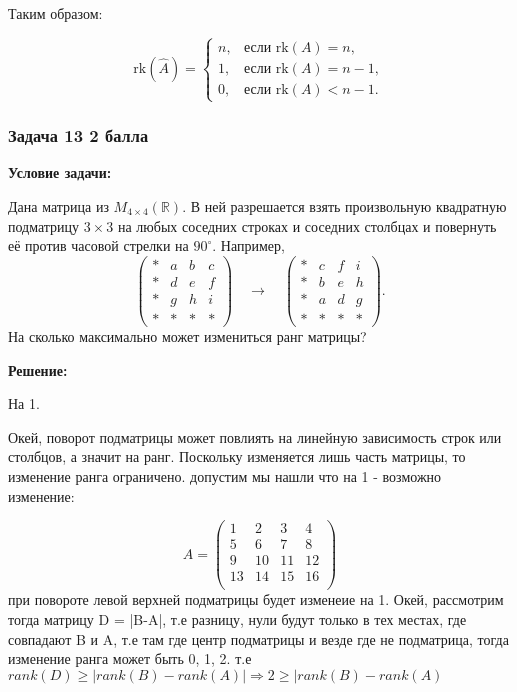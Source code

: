 \documentclass[a4paper,12pt]{article}
\begin{document}
Таким образом: 

\[
\text{rk}(\hat{A}) =
\begin{cases}
n, & \text{если } \text{rk}(A) = n, \\
1, & \text{если } \text{rk}(A) = n - 1, \\
0, & \text{если } \text{rk}(A) < n - 1.
\end{cases}
\]

\subsubsection{Задача 13 \hfill 2 балла}
\textbf{Условие задачи:}

Дана матрица из \( M_{4 \times 4}(\mathbb{R}) \). В ней разрешается взять произвольную квадратную подматрицу \( 3 \times 3 \) на любых соседних строках и соседних столбцах и повернуть её против часовой стрелки на \( 90^\circ \). Например,
\[
\begin{pmatrix}
* & a & b & c \\
* & d & e & f \\
* & g & h & i \\
* & * & * & *
\end{pmatrix}
\quad \rightarrow \quad
\begin{pmatrix}
* & c & f & i \\
* & b & e & h \\
* & a & d & g \\
* & * & * & *
\end{pmatrix}.
\]
На сколько максимально может измениться ранг матрицы?

\textbf{Решение:}

На 1. 

Окей, поворот подматрицы может повлиять на линейную зависимость строк или столбцов, а значит на ранг. Поскольку изменяется лишь часть матрицы, то изменение ранга ограничено. допустим мы нашли что на 1 - возможно изменение: 

\[
A = \begin{pmatrix}
    1& 2& 3& 4 \\
    5& 6 &7 &8 \\
    9 &10 &11& 12 \\
    13 &14 &15& 16 \\
\end{pmatrix}
\]
при повороте левой верхней подматрицы будет изменеие на 1. Окей, рассмотрим тогда матрицу D = |B-A|, т.е разницу, нули будут только в тех местах, где совпадают B и A, т.е там где центр подматрицы и везде где не подматрица, тогда изменение ранга может быть 0, 1, 2. т.е $rank(D) \ge |rank(B) - rank(A)| \Rightarrow 2 \ge |rank(B) - rank(A)$
\end{document}
